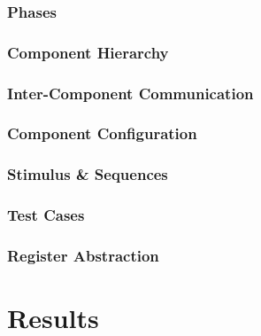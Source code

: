 \documentclass[11pt]{report}
\begin{document}
\subsection{Phases} %

\subsection{Component Hierarchy} %

\subsection{Inter-Component Communication} %

\subsection{Component Configuration} %

\subsection{Stimulus \& Sequences} %

\subsection{Test Cases} %

\subsection{Register Abstraction} %

\chapter{Results} %
\end{document}

